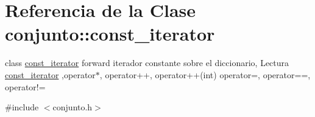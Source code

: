 \hypertarget{classconjunto_1_1const__iterator}{}\section{Referencia de la Clase conjunto\+:\+:const\+\_\+iterator}
\label{classconjunto_1_1const__iterator}


class \hyperlink{classconjunto_1_1const__iterator}{const\+\_\+iterator} forward iterador constante sobre el diccionario, Lectura \hyperlink{classconjunto_1_1const__iterator}{const\+\_\+iterator} ,operator$\ast$, operator++, operator++(int) operator=, operator==, operator!=  




{\ttfamily \#include $<$conjunto.\+h$>$}

